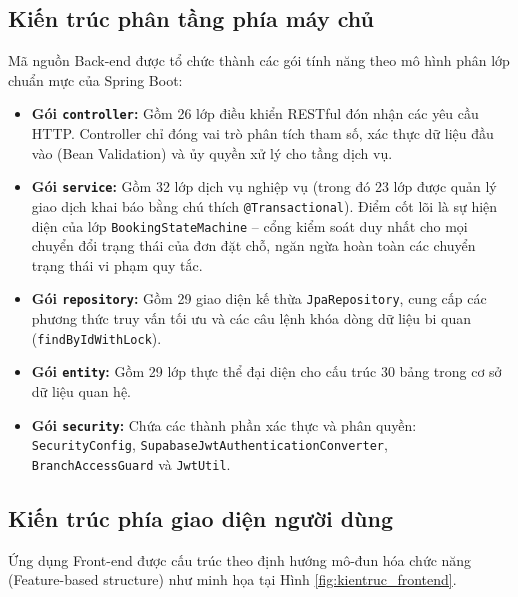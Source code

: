 \subsection{Kiến trúc phân tầng phía máy chủ}
\label{ssec:phantang_be}
Mã nguồn Back-end được tổ chức thành các gói tính năng theo mô hình phân lớp chuẩn mực của Spring Boot:
\begin{itemize}
    \item \textbf{Gói \texttt{controller}:} Gồm 26 lớp điều khiển RESTful đón nhận các yêu cầu HTTP. Controller chỉ đóng vai trò phân tích tham số, xác thực dữ liệu đầu vào (Bean Validation) và ủy quyền xử lý cho tầng dịch vụ.
    \item \textbf{Gói \texttt{service}:} Gồm 32 lớp dịch vụ nghiệp vụ (trong đó 23 lớp được quản lý giao dịch khai báo bằng chú thích \texttt{@Transactional}). Điểm cốt lõi là sự hiện diện của lớp \texttt{BookingStateMachine} -- cổng kiểm soát duy nhất cho mọi chuyển đổi trạng thái của đơn đặt chỗ, ngăn ngừa hoàn toàn các chuyển trạng thái vi phạm quy tắc.
    \item \textbf{Gói \texttt{repository}:} Gồm 29 giao diện kế thừa \texttt{JpaRepository}, cung cấp các phương thức truy vấn tối ưu và các câu lệnh khóa dòng dữ liệu bi quan (\texttt{findByIdWithLock}).
    \item \textbf{Gói \texttt{entity}:} Gồm 29 lớp thực thể đại diện cho cấu trúc 30 bảng trong cơ sở dữ liệu quan hệ.
    \item \textbf{Gói \texttt{security}:} Chứa các thành phần xác thực và phân quyền: \texttt{SecurityConfig}, \texttt{SupabaseJwtAuthenticationConverter}, \texttt{BranchAccessGuard} và \texttt{JwtUtil}.
\end{itemize}

\subsection{Kiến trúc phía giao diện người dùng}
\label{ssec:phantang_fe}
Ứng dụng Front-end được cấu trúc theo định hướng mô-đun hóa chức năng (Feature-based structure) như minh họa tại Hình \ref{fig:kientruc_frontend}.


